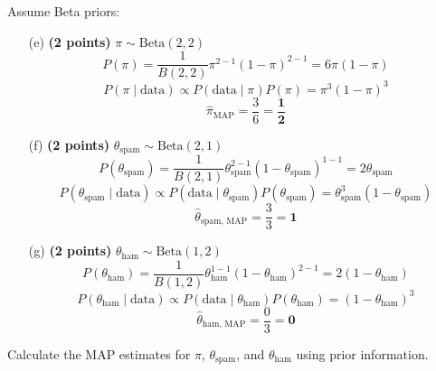 \documentclass{article}
\begin{document}
\noindent Assume Beta priors:
\begin{itemize}
    \item[(e)] \textbf{(2 points)} $\pi \sim \text{Beta}(2, 2)$
    \[
    P(\pi) = \frac{1}{B(2, 2)} \pi^{2-1} (1 - \pi)^{2-1} = 6\pi(1 - \pi)
    \]
    \[
    P(\pi \mid \text{data}) \propto P(\text{data} \mid \pi) P(\pi) = \pi^3 (1 - \pi)^3
    \]
    \[
    \hat{\pi}_{\text{MAP}} = \frac{3}{6} = \mathbf{\frac{1}{2}}
    \]
    \item[(f)] \textbf{(2 points)} $\theta_{\text{spam}} \sim \text{Beta}(2, 1)$
    \[
    P(\theta_{\text{spam}}) = \frac{1}{B(2, 1)} \theta_{\text{spam}}^{2-1} (1 - \theta_{\text{spam}})^{1-1} = 2\theta_{\text{spam}}
    \]
    \[
    P(\theta_{\text{spam}} \mid \text{data}) \propto P(\text{data} \mid \theta_{\text{spam}}) P(\theta_{\text{spam}}) = \theta_{\text{spam}}^3 (1 - \theta_{\text{spam}})
    \]
    \[
    \hat{\theta}_{\text{spam, MAP}} = \frac{3}{3} = \mathbf{1}
    \]
    \item[(g)] \textbf{(2 points)} $\theta_{\text{ham}} \sim \text{Beta}(1, 2)$
    \[
    P(\theta_{\text{ham}}) = \frac{1}{B(1, 2)} \theta_{\text{ham}}^{1-1} (1 - \theta_{\text{ham}})^{2-1} = 2(1 - \theta_{\text{ham}})
    \]
    \[
    P(\theta_{\text{ham}} \mid \text{data}) \propto P(\text{data} \mid \theta_{\text{ham}}) P(\theta_{\text{ham}}) = (1 - \theta_{\text{ham}})^3
    \]
    \[
    \hat{\theta}_{\text{ham, MAP}} = \frac{0}{3} = \mathbf{0}
    \]
\end{itemize}

\noindent Calculate the MAP estimates for $\pi$, $\theta_{\text{spam}}$, and $\theta_{\text{ham}}$ using prior information. 
\end{document}

